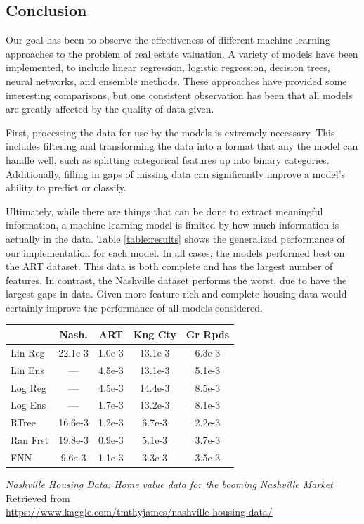 \documentclass[10pt]{article}
\begin{document}
\begin{multicols}{2}
 		\section{Conclusion}
 		Our goal has been to observe the effectiveness of different machine learning approaches to the problem of real estate valuation. A variety of models have been implemented, to include linear regression, logistic regression, decision trees, neural networks, and ensemble methods. These approaches have provided some interesting comparisons, but one consistent observation has been that all models are greatly affected by the quality of data given.

		First, processing the data for use by the models is extremely necessary. This includes filtering and transforming the data into a format that any the model can handle well, such as splitting categorical features up into binary categories. Additionally, filling in gaps of missing data can significantly improve a model's ability to predict or classify.

		Ultimately, while there are things that can be done to extract meaningful information, a machine learning model is limited by how much information is actually in the data.  Table \ref{table:results} shows the generalized performance of our implementation for each model.  In all cases, the models performed best on the ART dataset.  This data is both complete and has the largest number of features.  In contrast, the Nashville dataset performs the worst, due to have the largest gaps in data. Given more feature-rich and complete housing data would certainly improve the performance of all models considered.
		
		\begin{center}
	        \captionsetup{type=table}
	        \begin{tabular}{l|c|c|c|c}
	        	         & Nash.   & ART     & Kng Cty & Gr Rpds \\
	        	\hline
	        	Lin Reg  & 22.1e-3 & 1.0e-3  & 13.1e-3  & 6.3e-3 \\
	        	Lin Ens  & ---     & 4.5e-3  & 13.1e-3  & 5.1e-3 \\
	        	Log Reg  & ---     & 4.5e-3  & 14.4e-3  & 8.5e-3 \\
	        	Log Ens  & ---     & 1.7e-3 & 13.2e-3  & 8.1e-3 \\
	        	RTree  	 & 16.6e-3 & 1.2e-3	 & 6.7e-3  & 2.2e-3  \\
	        	Ran Frst & 19.8e-3 & 0.9e-3  & 5.1e-3  & 3.7e-3  \\
	        	FNN      & 9.6e-3  & 1.1e-3  & 3.3e-3  & 3.5e-3  \\	        	
	        \end{tabular}
			\label{table:results}
		\end{center}
		\begin{thebibliography}{13}
			\textit{Nashville Housing Data: Home value data for the booming Nashville Market}
			Retrieved from \\ \small{\url{https://www.kaggle.com/tmthyjames/nashville-housing-data/}}
			

\end{thebibliography}
\end{multicols}
\end{document}
